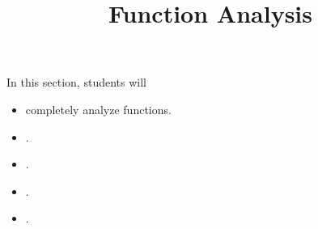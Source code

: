 \documentclass{ximera}
\title{Function Analysis}
\begin{document}
\begin{abstract}
\end{abstract}
\maketitle

\begin{sectionOutcomes}
In this section, students will 

\begin{itemize}
\item completely analyze functions.
\item .
\item .
\item .
\item .
\end{itemize}
\end{sectionOutcomes}
\end{document}
